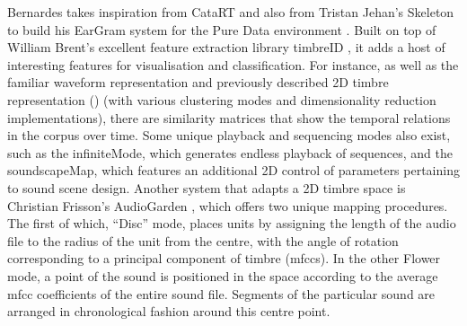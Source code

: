 Bernardes takes inspiration from CataRT and also from Tristan Jehan’s Skeleton \citep{Jehan2005} to build his EarGram system for the Pure Data environment \citep{Bernardes2013}. Built on top of William Brent’s excellent feature extraction library timbreID \citep{Brent2010}, it adds a host of interesting features for visualisation and classification.  For instance, as well as the familiar waveform representation and previously described 2D timbre representation () (with various clustering modes and dimensionality reduction implementations), there are similarity matrices that show the temporal relations in the corpus over time. Some unique playback and sequencing modes also exist, such as the infiniteMode, which generates endless playback of sequences, and the soundscapeMap, which features an additional 2D control of parameters pertaining to sound scene design. Another system that adapts a 2D timbre space is Christian Frisson’s AudioGarden \citep{Frisson2010}, which offers two unique mapping procedures. The first of which, “Disc” mode, places units by assigning the length of the audio file to the radius of the unit from the centre, with the angle of rotation corresponding to a principal component of timbre (\acrshort{mfcc}s).  In the other Flower mode, a point of the sound is positioned in the space according to the average \acrshort{mfcc} coefficients of the entire sound file. Segments of the particular sound are arranged in chronological fashion around this centre point.

